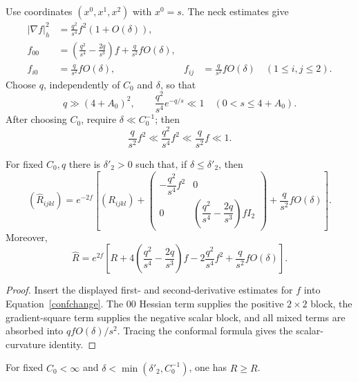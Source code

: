 Use coordinates $(x^0,x^1,x^2)$ with $x^0=s$. The neck estimates give
\[
\begin{aligned}
|\nabla f|_h^2&=\frac{q^2}{s^4}f^2(1+O(\delta)),\\
f_{00}&=\left(\frac{q^2}{s^4}-\frac{2q}{s^3}\right)f
+\frac q{s^2}fO(\delta),\\
f_{i0}&=\frac q{s^2}fO(\delta),
&f_{ij}&=\frac q{s^2}fO(\delta)\quad(1\leq i,j\leq2).
\end{aligned}
\]
Choose $q$, independently of $C_0$ and $\delta$, so that
\begin{equation}
\label{qeqn}
  q\gg(4+A_0)^2,
  \qquad
  \frac{q^2}{s^4}e^{-q/s}\ll1
  \quad(0<s\leq4+A_0).
\end{equation}
After choosing $C_0$, require $\delta\ll C_0^{-1}$; then
\[
  \frac q{s^2}f^2\ll\frac{q^2}{s^4}f^2
  \ll\frac q{s^2}f\ll1.
\]

\begin{corollary}
\label{cor:conformal-curvature-formula}
\label{delta0}
For fixed $C_0,q$ there is $\delta'_2>0$ such that, if
$\delta\leq\delta'_2$, then
\begin{equation}
\label{maineqn}
(\widehat R_{ijkl})=e^{-2f}\left[
(R_{ijkl})+
\begin{pmatrix}
-\dfrac{q^2}{s^4}f^2&0\\
0&\left(\dfrac{q^2}{s^4}-\dfrac{2q}{s^3}\right)fI_2
\end{pmatrix}
+\frac q{s^2}fO(\delta)\right].
\end{equation}
Moreover,
\[
  \widehat R=e^{2f}\left[
  R+4\left(\frac{q^2}{s^4}-\frac{2q}{s^3}\right)f
  -2\frac{q^2}{s^4}f^2+\frac q{s^2}fO(\delta)\right].
\]
\end{corollary}

\begin{proof}
\sketch
Insert the displayed first- and second-derivative estimates for $f$ into
Equation~\eqref{confchange}. The $00$ Hessian term supplies the positive
$2\times2$ block, the gradient-square term supplies the negative scalar block,
and all mixed terms are absorbed into $qfO(\delta)/s^2$. Tracing the conformal
formula gives the scalar-curvature identity.
\end{proof}

\begin{corollary}
\label{cor:scalar-curvature-nondecreasing-conformal}
\label{Rcompar}
For fixed $C_0<\infty$ and
$\delta<\min(\delta'_2,C_0^{-1})$, one has $\widehat R\geq R$.
\end{corollary}

